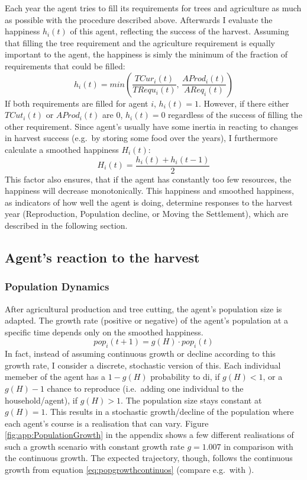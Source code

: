 Each year the agent tries to fill its requirements for trees and agriculture as much as possible with the procedure described above. 
Afterwards I evaluate the happiness $h_i(t)$ of this agent, reflecting the success of the harvest.
Assuming that filling the tree requirement and the agriculture requirement is equally important to the agent, the happiness is simly the minimum of the fraction of requirements that could be filled:
\begin{equation} 
	h_i(t) = min \left( \frac{TCur_{i}(t)}{TRequ_i(t)}, \, \frac{AProd_i(t)}{AReq_i(t)} \right)
	\label{eq:h_i}
\end{equation}
If both requirements are filled for agent $i$, $h_i(t)=1$.
However, if there either $TCut_i(t)$ or $AProd_i(t)$ are $0$, $h_i(t)=0$ regardless of the success of filling the other requirement.
Since agent's usually have some inertia in reacting to changes in harvest success (e.g.\ by storing some food over the years), I furthermore calculate a smoothed happiness $H_i(t)$:
\begin{equation}
	H_i(t) = \frac{h_i(t) + h_i(t-1)}{2}
\end{equation}
This factor also ensures, that if the agent has constantly too few resources, the happiness will decrease monotonically.
This happiness and smoothed happiness, as indicators of how well the agent is doing, determine responses to the harvest year (Reproduction, Population decline, or Moving the Settlement), which are described in the following section.


\subsection{Agent's reaction to the harvest}\label{sec:Reaction} 
\subsubsection{Population Dynamics}


After agricultural production and tree cutting, the agent's population size is adapted. 
The growth rate (positive or negative) of the agent's population at a specific time depends only on the smoothed happiness. 
\begin{equation}\label{eq:popgrowthcontinuos}
	pop_i(t+1) = g(H) \cdot pop_i(t)
\end{equation}
In fact, instead of assuming continuous growth or decline according to this growth rate, I consider a discrete, stochastic version of this.
Each individual memeber of the agent has a $1-g(H)$ probability to di, if $g(H)<1$, or a $g(H)-1$ chance to reproduce (i.e.\ adding one individual to the household/agent), if $g(H)>1$.
The population size stays constant at $g(H)=1$. 
This results in a stochastic growth/decline of the population where each agent's course is a realisation that can vary. 
Figure \ref{fig:app:PopulationGrowth} \TODO in the appendix shows a few different realisations of such a growth scenario with constant growth rate $g=1.007$ in comparison with the continuous growth.
The expected trajectory, though, follows the continuous growth from equation \ref{eq:popgrowthcontinuos} (compare e.g.\ with \cite{Bungartz2013}).

